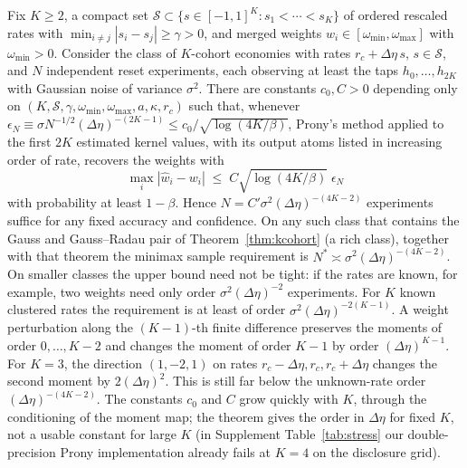\begin{theorem}\label{prop:esprit}
Fix $K\ge2$, a compact set $\mathcal S\subset\{s\in[-1,1]^K:s_1<\cdots<s_K\}$ of ordered rescaled rates with $\min_{i\ne j}|s_i-s_j|\ge\gamma>0$, and merged weights $w_i\in[\omega_{\min},\omega_{\max}]$ with $\omega_{\min}>0$. Consider the class of $K$-cohort economies with rates $r_c+\Delta\eta\,s$, $s\in\mathcal S$, and $N$ independent reset experiments, each observing at least the taps $h_0,\ldots,h_{2K}$ with Gaussian noise of variance $\sigma^2$. There are constants $c_0,C>0$ depending only on $(K,\mathcal S,\gamma,\omega_{\min},\omega_{\max},a,\kappa,r_c)$ such that, whenever $\epsilon_N\equiv\sigma N^{-1/2}(\Delta\eta)^{-(2K-1)}\le c_0/\sqrt{\log(4K/\beta)}$, Prony's method applied to the first $2K$ estimated kernel values, with its output atoms listed in increasing order of rate, recovers the weights with
\[
\max_i|\hat w_i-w_i|\;\le\;C\sqrt{\log(4K/\beta)}\;\epsilon_N
\]
with probability at least $1-\beta$. Hence $N=C'\sigma^2(\Delta\eta)^{-(4K-2)}$ experiments suffice for any fixed accuracy and confidence. On any such class that contains the Gauss and Gauss--Radau pair of Theorem~\ref{thm:kcohort} (a rich class), together with that theorem the minimax sample requirement is $N^*\asymp\sigma^2(\Delta\eta)^{-(4K-2)}$. On smaller classes the upper bound need not be tight: if the rates are known, for example, two weights need only order $\sigma^2(\Delta\eta)^{-2}$ experiments. For $K$ known clustered rates the requirement is at least of order $\sigma^2(\Delta\eta)^{-2(K-1)}$. A weight perturbation along the $(K-1)$-th finite difference preserves the moments of order $0,\ldots,K-2$ and changes the moment of order $K-1$ by order $(\Delta\eta)^{K-1}$. For $K=3$, the direction $(1,-2,1)$ on rates $r_c-\Delta\eta,r_c,r_c+\Delta\eta$ changes the second moment by $2(\Delta\eta)^2$. This is still far below the unknown-rate order $(\Delta\eta)^{-(4K-2)}$. The constants $c_0$ and $C$ grow quickly with $K$, through the conditioning of the moment map; the theorem gives the order in $\Delta\eta$ for fixed $K$, not a usable constant for large $K$ (in Supplement Table~\ref{tab:stress} our double-precision Prony implementation already fails at $K=4$ on the disclosure grid).
\end{theorem}

